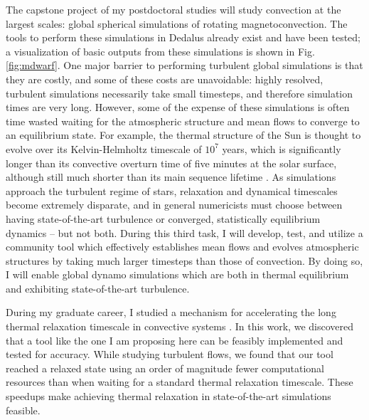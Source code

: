 \documentclass[11pt, preprint]{aastex}
\begin{document}
The capstone project of my postdoctoral studies will study convection at the largest scales: global spherical simulations of rotating magnetoconvection.
The tools to perform these simulations in Dedalus already exist \citep{lecoanet&all2018} and have been tested; a visualization of basic outputs from these simulations is shown in Fig. \ref{fig:mdwarf}.
One major barrier to performing turbulent global simulations is that they are costly, and some of these costs are unavoidable: highly resolved, turbulent simulations necessarily take small timesteps, and therefore simulation times are very long.
However, some of the expense of these simulations is often time wasted waiting for the atmospheric structure and mean flows to converge to an equilibrium state.
For example, the thermal structure of the Sun is thought to evolve over its Kelvin-Helmholtz timescale of $10^7$ years, which is significantly longer than its convective overturn time of five minutes at the solar surface, although still much shorter than its main sequence lifetime \citep{anders&all2018}.
As simulations approach the turbulent regime of stars, relaxation and dynamical timescales become extremely disparate, and in general numericists must choose between having state-of-the-art turbulence or converged, statistically equilibrium dynamics -- but not both.
During this third task, I will develop, test, and utilize a community tool which effectively establishes mean flows and evolves atmospheric structures by taking much larger timesteps than those of convection.
By doing so, I will enable global dynamo simulations which are both in thermal equilibrium and exhibiting state-of-the-art turbulence.


During my graduate career, I studied a mechanism for accelerating the long thermal relaxation timescale in convective systems \citep{anders&all2018}.
In this work, we discovered that a tool like the one I am proposing here can be feasibly implemented and tested for accuracy.
While studying turbulent flows, we found that our tool reached a relaxed state using an order of magnitude fewer computational resources than when waiting for a standard thermal relaxation timescale.
These speedups make achieving thermal relaxation in state-of-the-art simulations feasible.

\vspace{-0.5cm}
\end{document}
